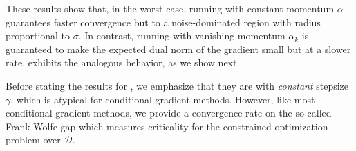 These results show that, in the worst-case, running  with constant momentum $\alpha$ guarantees faster convergence but to a noise-dominated region with radius proportional to $\sigma$. In contrast, running  with vanishing momentum $\alpha_k$ is guaranteed to make the expected dual norm of the gradient small but at a slower rate.  exhibits the analogous behavior, as we show next.

Before stating the results for , we emphasize that they are with \emph{constant} stepsize $\gamma$, which is atypical for conditional gradient methods. However, like most conditional gradient methods, we provide a convergence rate on the so-called Frank-Wolfe gap which measures criticality for the constrained optimization problem over $\mathcal{D}$. 

